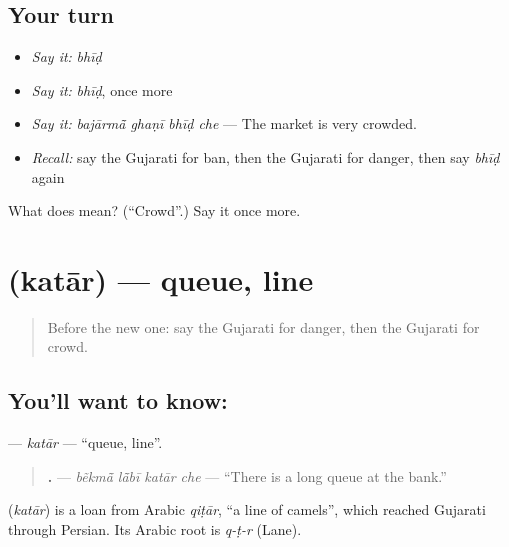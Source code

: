 \subsection*{Your turn}
\begin{itemize}
\raggedright
  \item \emph{Say it:} \emph{bhīḍ}
  \item \emph{Say it:} \emph{bhīḍ}, once more
  \item \emph{Say it:} \emph{bajārmā̃ ghaṇī bhīḍ che} — The market is very crowded.
  \item \emph{Recall:} say the Gujarati for ban, then the Gujarati for danger, then say \emph{bhīḍ} again
\end{itemize}

\begin{tcolorbox}[breakable,colback=teal!4,colframe=teal!35!black,title={Before you move on}]
What does  mean? (\textquotedblleft{}Crowd\textquotedblright{}.) Say it once more.
\end{tcolorbox}
\section[\texorpdfstring{\gu{કતાર} (katār)}{કતાર (katār)}]{ (katār) — queue, line}

\label{lesson:GU-C199-katar}



\begin{quote}
Before the new one: say the Gujarati for danger, then the Gujarati for crowd.
\end{quote}

\subsection*{You'll want to know: }
\textbf{} — \emph{katār} — \textquotedblleft{}queue, line\textquotedblright{}.

\begin{quote}
\textbf{   .} — \emph{bẽkmā̃ lā̃bī katār che} — \textquotedblleft{}There is a long queue at the bank.\textquotedblright{}
\end{quote}

\begin{cousinweb}
\textbf{} (\emph{katār}) is a loan from Arabic \emph{qiṭār}, \textquotedblleft{}a line of camels\textquotedblright{}, which reached Gujarati through Persian. Its Arabic root is \emph{q-ṭ-r} (Lane).
\end{cousinweb}

